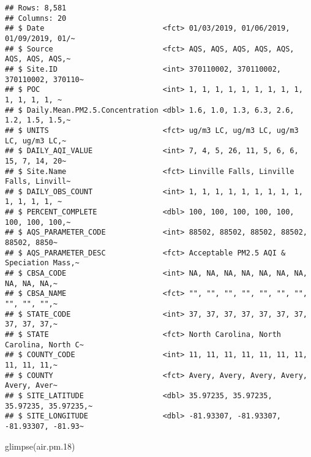 \documentclass[
]{article}
\newenvironment{Shaded}{\begin{snugshade}}{\end{snugshade}}
\newcommand{\FloatTok}[1]{\textcolor[rgb]{0.00,0.00,0.81}{#1}}
\newcommand{\FunctionTok}[1]{\textcolor[rgb]{0.00,0.00,0.00}{#1}}
\newcommand{\NormalTok}[1]{#1}
\begin{document}
\begin{verbatim}
## Rows: 8,581
## Columns: 20
## $ Date                           <fct> 01/03/2019, 01/06/2019, 01/09/2019, 01/~
## $ Source                         <fct> AQS, AQS, AQS, AQS, AQS, AQS, AQS, AQS,~
## $ Site.ID                        <int> 370110002, 370110002, 370110002, 370110~
## $ POC                            <int> 1, 1, 1, 1, 1, 1, 1, 1, 1, 1, 1, 1, 1, ~
## $ Daily.Mean.PM2.5.Concentration <dbl> 1.6, 1.0, 1.3, 6.3, 2.6, 1.2, 1.5, 1.5,~
## $ UNITS                          <fct> ug/m3 LC, ug/m3 LC, ug/m3 LC, ug/m3 LC,~
## $ DAILY_AQI_VALUE                <int> 7, 4, 5, 26, 11, 5, 6, 6, 15, 7, 14, 20~
## $ Site.Name                      <fct> Linville Falls, Linville Falls, Linvill~
## $ DAILY_OBS_COUNT                <int> 1, 1, 1, 1, 1, 1, 1, 1, 1, 1, 1, 1, 1, ~
## $ PERCENT_COMPLETE               <dbl> 100, 100, 100, 100, 100, 100, 100, 100,~
## $ AQS_PARAMETER_CODE             <int> 88502, 88502, 88502, 88502, 88502, 8850~
## $ AQS_PARAMETER_DESC             <fct> Acceptable PM2.5 AQI & Speciation Mass,~
## $ CBSA_CODE                      <int> NA, NA, NA, NA, NA, NA, NA, NA, NA, NA,~
## $ CBSA_NAME                      <fct> "", "", "", "", "", "", "", "", "", "",~
## $ STATE_CODE                     <int> 37, 37, 37, 37, 37, 37, 37, 37, 37, 37,~
## $ STATE                          <fct> North Carolina, North Carolina, North C~
## $ COUNTY_CODE                    <int> 11, 11, 11, 11, 11, 11, 11, 11, 11, 11,~
## $ COUNTY                         <fct> Avery, Avery, Avery, Avery, Avery, Aver~
## $ SITE_LATITUDE                  <dbl> 35.97235, 35.97235, 35.97235, 35.97235,~
## $ SITE_LONGITUDE                 <dbl> -81.93307, -81.93307, -81.93307, -81.93~
\end{verbatim}

\begin{Shaded}
\begin{Highlighting}[]
\FunctionTok{glimpse}\NormalTok{(air.pm}\FloatTok{.18}\NormalTok{)}
\end{Highlighting}
\end{Shaded}
\end{document}
